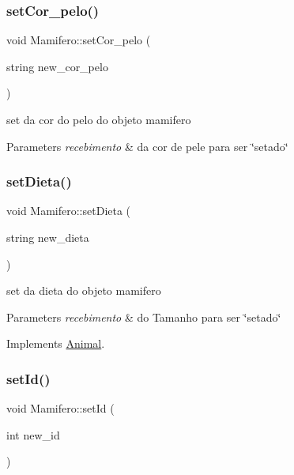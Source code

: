 \subsubsection{\texorpdfstring{setCor\_pelo()}{setCor\_pelo()}}
{\footnotesize\ttfamily void Mamifero\+::set\+Cor\+\_\+pelo (\begin{DoxyParamCaption}\item[{string}]{new\+\_\+cor\+\_\+pelo }\end{DoxyParamCaption})}



set da cor do pelo do objeto mamifero 


\begin{DoxyParams}{Parameters}
{\em recebimento} & da cor de pele para ser \char`\"{}setado\char`\"{} \\
\hline
\end{DoxyParams}
\mbox{\label{class_mamifero_af9072b6a5e202606b9b8c7c71c5318d4}} 
\subsubsection{\texorpdfstring{setDieta()}{setDieta()}}
{\footnotesize\ttfamily void Mamifero\+::set\+Dieta (\begin{DoxyParamCaption}\item[{string}]{new\+\_\+dieta }\end{DoxyParamCaption})\hspace{0.3cm}{\ttfamily [virtual]}}



set da dieta do objeto mamifero 


\begin{DoxyParams}{Parameters}
{\em recebimento} & do Tamanho para ser \char`\"{}setado\char`\"{} \\
\hline
\end{DoxyParams}


Implements \mbox{\hyperlink{class_animal}{Animal}}.

\mbox{\label{class_mamifero_a7c56e8b89fdbeb2af5c886f636229f21}} 
\subsubsection{\texorpdfstring{setId()}{setId()}}
{\footnotesize\ttfamily void Mamifero\+::set\+Id (\begin{DoxyParamCaption}\item[{int}]{new\+\_\+id }\end{DoxyParamCaption})\hspace{0.3cm}{\ttfamily [virtual]}}



